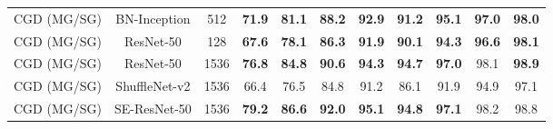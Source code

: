\documentclass[10pt,twocolumn,letterpaper]{article}
\begin{document}
\begin{CJK}{UTF8}{mj}
\begin{table*}[h!t]
\begin{center}
{\begin{adjustbox}{width=0.77\textwidth,center}
\begin{tabular}{c|c|c|cccc|cccc}
    CGD (MG/SG)             & \color{OliveGreen}BN-Inception               & \color{OliveGreen}512                  & {\color{OliveGreen}\textbf{71.9}}  & {\color{OliveGreen}\textbf{81.1}}  & {\color{OliveGreen}\textbf{88.2}} & {\color{OliveGreen}\textbf{92.9}} & {\color{OliveGreen}\textbf{91.2}}  & {\color{OliveGreen}\textbf{95.1}}  & {\color{OliveGreen}\textbf{97.0}} & {\color{OliveGreen}\textbf{98.0}} \\
    CGD (MG/SG)             & \color{blue}ResNet-50                  & \color{blue}128                  & {\color{blue}\textbf{67.6}}  & {\color{blue}\textbf{78.1}}  & {\color{blue}\textbf{86.3}} & {\color{blue}\textbf{91.9}} & {\color{blue}\textbf{90.1}}  & {\color{blue}\textbf{94.3}}  & {\color{blue}\textbf{96.6}} & {\color{blue}\textbf{98.1}} \\
    CGD (MG/SG)             & \color{red}ResNet-50         & \color{red}1536                 & {\color{red}\textbf{76.8}}  & {\color{red}\textbf{\textbf{84.8}}}  & {\color{red}\textbf{90.6}} & {\color{red}\textbf{94.3}} & {\color{red}\textbf{94.7}}  & {\color{red}\textbf{97.0}}  & {\color{red}98.1} & {\color{red}\textbf{98.9}} \\
    CGD (MG/SG)             & ShuffleNet-v2             & 1536                 & 66.4  & 76.5  & 84.8 & 91.2 & 86.1  & 91.9  & 94.9 & 97.1 \\
    CGD (MG/SG)             & SE-ResNet-50      & 1536                 & \textbf{79.2}  & \textbf{86.6}  & \textbf{92.0} & \textbf{95.1} & \textbf{94.8}  & \textbf{97.1}  & 98.2 & 98.8 \\ \hline
    \end{tabular}
    \end{adjustbox}
    \label{table:sota1}
}


\end{center}
\end{table*}
\end{CJK}
\end{document}
